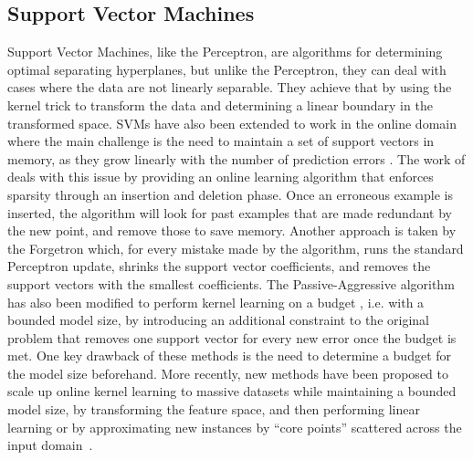 \subsection*{Support Vector Machines}
Support Vector Machines, like the Perceptron, are algorithms for determining
optimal separating hyperplanes, but unlike the Perceptron, they can deal with
cases where the data are not linearly separable. They achieve that by using the
kernel trick to transform the data and determining a linear boundary in
the transformed space\cite{esl}.
SVMs have also
been extended to work in the online domain \cite{online-kernels}
where the main challenge is the need to maintain a set of support vectors
in memory, as they grow linearly with the number of prediction errors
\cite{budget-classification}. The work of \citet{budget-classification}
deals with this issue by providing an online learning algorithm
that enforces sparsity through an insertion and deletion phase.
Once an erroneous example is inserted, the algorithm will look
for past examples that are made redundant by the new point,
and remove those to save memory.
Another approach is taken by the Forgetron \cite{forgetron} which,
for every mistake made by the algorithm, runs the standard
Perceptron update, shrinks the support vector coefficients, and removes
the support vectors with the smallest coefficients.
The Passive-Aggressive algorithm has also been modified
to perform kernel learning on a budget \cite{pa-budget},
i.e. with a bounded model size, by introducing an additional
constraint to the original problem that removes one support
vector for every new error once the budget is met.
One key drawback of these methods
is the need to determine a budget for the model size beforehand.
More recently, new methods have been proposed to scale up
online kernel learning to massive datasets while maintaining a bounded model size,
by transforming the feature space, and then performing linear learning \cite{large-online-kernels}
or by approximating new instances by ``core points''
scattered across the input domain~\cite{approximation-vm}.

